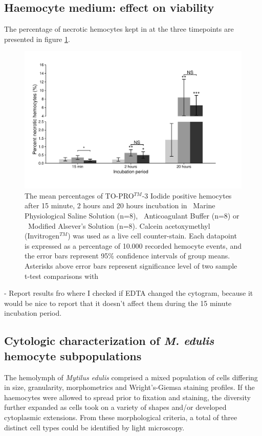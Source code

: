 \subsection{Haemocyte medium: effect on viability}
 The percentage of necrotic hemocytes kept in at the three timepoints are presented in figure \ref{fig:BufferViability}. \lipsum[2]

\begin{figure}[!ht]
    \centering
    \includegraphics[width=1.13\textwidth]{figures/Method development/grouped bargraph scaled.pdf}
    \caption{The mean percentages of TO-PRO$^{TM}$-3 Iodide positive hemocytes after 15 minute, 2 hours and 20 hours incubation in \protect\lysegraabox \ Marine Physiological Saline Solution (n=8), \protect\customgraybox \ Anticoagulant Buffer (n=8) or \protect\darkgraybox \ Modified Alsever's Solution (n=8). Calcein acetoxymethyl (Invitrogen$^{TM}$) was used as a live cell counter-stain. Each datapoint is expressed as a percentage of 10.000 recorded hemocyte events, and the error bars represent 95\% confidence intervals of group means. Asterisks above error bars represent significance level of two sample t-test comparisons with }
    \label{fig:BufferViability}
\end{figure}

- Report results fro where I checked if EDTA changed the cytogram, because it would be nice to report that it doesn't affect them during the 15 minute incubation period.

\subsection{Cytologic characterization of \emph{M. edulis} hemocyte subpopulations}
\label{subsection:Results_cytchar}
The hemolymph of \emph{Mytilus edulis} comprised a mixed population of cells differing in size, granularity, morphometrics and Wright's-Giemsa staining profiles. If the haemocytes were allowed to spread prior to fixation and staining, the diversity further expanded as cells took on a variety of shapes and/or developed cytoplasmic extensions. From these morphological criteria, a total of three distinct cell types could be identified by light microscopy.

